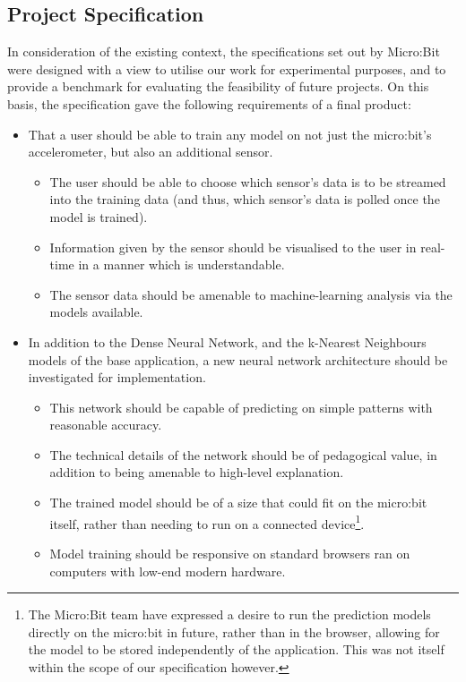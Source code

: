 \documentclass{article}
\begin{document}

\subsection{Project Specification}%
\label{subsec:spec}

In consideration of the existing context, the specifications set out by Micro:Bit were designed with a view to utilise our work for experimental purposes, and to provide a benchmark for evaluating the feasibility of future projects. On this basis, the specification gave the following requirements of a final product:
\begin{itemize}
  \item That a user should be able to train any model on not just the micro:bit's accelerometer, but also an additional sensor.
        \begin{itemize}
                \item The user should be able to choose which sensor's data is to be streamed into the training data (and thus, which sensor's data is polled once the model is trained).
                \item Information given by the sensor should be visualised to the user in real-time in a manner which is understandable.
                \item The sensor data should be amenable to machine-learning analysis via the models available.
        \end{itemize}
  \item In addition to the Dense Neural Network, and the k-Nearest Neighbours models of the base application, a new neural network architecture should be investigated for implementation.
        \begin{itemize}
                \item This network should be capable of predicting on simple patterns with reasonable accuracy.
                \item The technical details of the network should be of pedagogical value, in addition to being amenable to high-level explanation.
                \item The trained model should be of a size that could fit on the micro:bit itself, rather than needing to run on a connected device\footnote{The Micro:Bit team have expressed a desire to run the prediction models directly on the micro:bit in future, rather than in the browser, allowing for the model to be stored independently of the application. This was not itself within the scope of our specification however.}.
                \item Model training should be responsive on standard browsers ran on computers with low-end modern hardware.
        \end{itemize}
\end{itemize}
\end{document}
